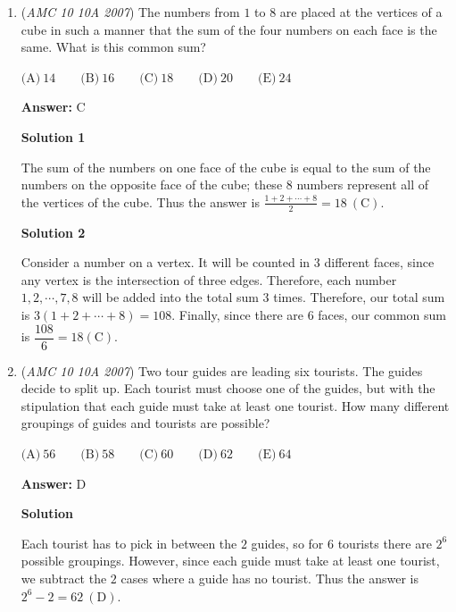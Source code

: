 \begin{enumerate}
 $m+48+xy=40+20x$
$(16+16x)+48=40+20x$.

 $x=6$. 

 Earlier, we set $x$ to be the number of children. Therefore, there are $\boxed{\text{(E)}  6}$ children.

 


	\item (\textit{AMC 10 10A 2007}) The numbers from $1$ to $8$ are placed at the vertices of a cube in such a manner that the sum of the four numbers on each face is the same. What is this common sum?


 $\text{(A)}\ 14 \qquad \text{(B)}\ 16 \qquad \text{(C)}\ 18 \qquad \text{(D)}\ 20 \qquad \text{(E)}\ 24$

 \textbf{Answer: }C



\textbf{Solution 1}

The sum of the numbers on one face of the cube is equal to the sum of the numbers on the opposite face of the cube; these $8$ numbers represent all of the vertices of the cube. Thus the answer is $\frac{1 + 2 + \cdots + 8}{2} = 18\ \mathrm{(C)}$.

 



\textbf{Solution 2}

Consider a number on a vertex. It will be counted in 3 different faces, since any vertex is the intersection of three edges. Therefore, each number $1,2,\cdots,7,8$ will be added into the total sum $3$ times. Therefore, our total sum is $3(1+2+\cdots+8)=108.$ Finally, since there are $6$ faces, our common sum is $\dfrac{108}{6} = 18\mathrm{(C) }.$



	\item (\textit{AMC 10 10A 2007}) Two tour guides are leading six tourists. The guides decide to split up. Each tourist must choose one of the guides, but with the stipulation that each guide must take at least one tourist. How many different groupings of guides and tourists are possible?


 $\text{(A)}\ 56 \qquad \text{(B)}\ 58 \qquad \text{(C)}\ 60 \qquad \text{(D)}\ 62 \qquad \text{(E)}\ 64$

 \textbf{Answer: }D



\textbf{Solution}

Each tourist has to pick in between the $2$ guides, so for $6$ tourists there are $2^6$ possible groupings. However, since each guide must take at least one tourist, we subtract the $2$ cases where a guide has no tourist. Thus the answer is $2^6 - 2 = \boxed{62}\ \mathrm{(D)}$.


\end{enumerate}
